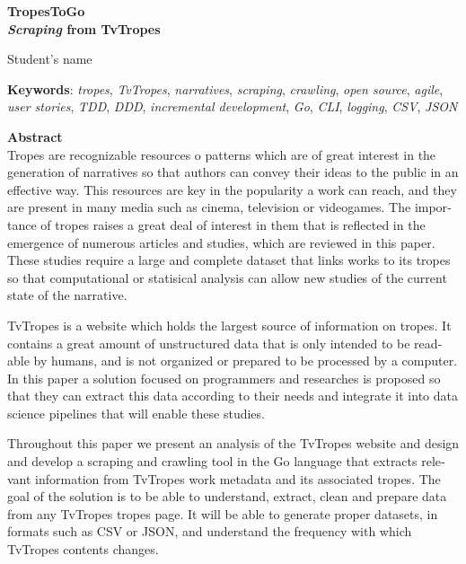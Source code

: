 \begin{otherlanguage}{english}

\begin{center}
    {\large\bfseries TropesToGo \\ \textit{Scraping} from TvTropes}\\
\end{center}
\begin{center}
    Student's name\\
\end{center}
\vspace{0.5cm}
\noindent\textbf{Keywords}: \textit{tropes}, \textit{TvTropes},
\textit{narratives}, \textit{scraping}, \textit{crawling}, \textit{open source},
\textit{agile}, \textit{user stories}, \textit{TDD}, \textit{DDD},
\textit{incremental development}, \textit{Go}, \textit{CLI}, \textit{logging},
\textit{CSV},
\textit{JSON}
\vspace{0.7cm}

\noindent\textbf{Abstract}\\

Tropes are recognizable resources o patterns which are of great interest in the
generation of narratives so that authors can convey their ideas to the public in
an effective way. This resources are key in the popularity a work can reach, and
they are present in many media such as cinema, television or videogames. The
importance of tropes raises a great deal of interest in them that is reflected
in the emergence of numerous articles and studies, which are reviewed in this
paper. These studies require a large and complete dataset that links works to
its tropes so that computational or statisical analysis can allow new studies of
the current state of the narrative.

TvTropes is a website which holds the largest source of information on tropes.
It contains a great amount of unstructured data that is only intended to be
readable by humans, and is not organized or prepared to be processed by a
computer. In this paper a solution focused on programmers and researches is
proposed so that they can extract this data according to their needs and
integrate it into data science pipelines that will enable these studies.

Throughout this paper we present an analysis of the TvTropes website and design
and develop a scraping and crawling tool in the Go language that extracts
relevant information from TvTropes work metadata and its associated tropes. The
goal of the solution is to be able to understand, extract, clean and prepare
data from any TvTropes tropes page. It will be able to generate proper datasets,
in formats such as CSV or JSON, and understand the frequency with which TvTropes
contents changes.


\end{otherlanguage}
